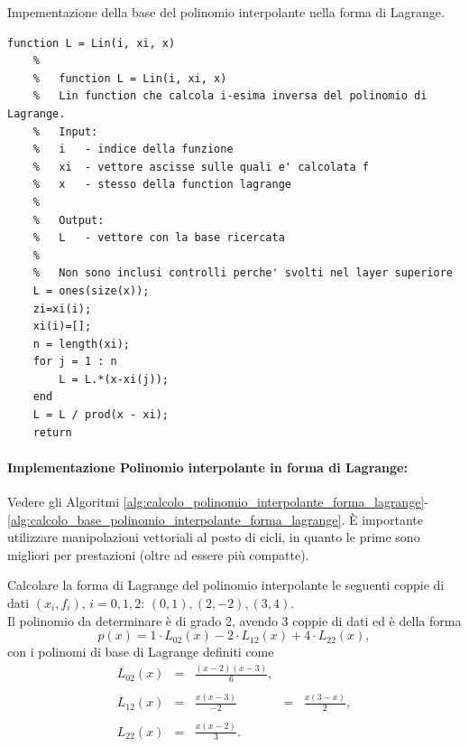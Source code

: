 \begin{algorithm}
\caption{Impementazione della base del polinomio interpolante nella forma di Lagrange.}\label{alg:calcolo_base_polinomio_interpolante_forma_lagrange}
    \begin{lstlisting}[style=Matlab-editor]
    function L = Lin(i, xi, x)
    %
    %   function L = Lin(i, xi, x)
    %   Lin function che calcola i-esima inversa del polinomio di Lagrange.
    %   Input:
    %   i   - indice della funzione
    %   xi  - vettore ascisse sulle quali e' calcolata f
    %   x   - stesso della function lagrange
    %
    %   Output:
    %   L   - vettore con la base ricercata
    %
    %   Non sono inclusi controlli perche' svolti nel layer superiore
    L = ones(size(x));
    zi=xi(i);
    xi(i)=[];
    n = length(xi);
    for j = 1 : n
        L = L.*(x-xi(j));
    end
    L = L / prod(x - xi);
    return
    \end{lstlisting}
\end{algorithm}

\paragraph{Implementazione Polinomio interpolante in forma di Lagrange:} Vedere gli Algoritmi \ref{alg:calcolo_polinomio_interpolante_forma_lagrange}-\ref{alg:calcolo_base_polinomio_interpolante_forma_lagrange}. È importante utilizzare manipolazioni vettoriali al posto di cicli, in quanto le prime sono migliori per prestazioni (oltre ad essere più compatte).

\begin{example}
	Calcolare la forma di Lagrange del polinomio interpolante le seguenti coppie di dati $(x_i, f_i),\, i=0,1,2$: $(0,1),(2,-2), (3,4)$.\\
	Il polinomio da determinare è di grado 2, avendo 3 coppie di dati ed è della forma
	\begin{equation*}
		p(x) = 1 \cdot L_{02}(x) - 2 \cdot L_{12}(x) + 4 \cdot L_{22}(x),
	\end{equation*}
	con i polinomi di base di Lagrange definiti come
	\begin{equation*}
		\begin{matrix}
			L_{02}(x) &=& \frac{(x-2)(x-3)}{6},\\\\
			L_{12}(x) &=& \frac{x(x-3)}{-2} &=& \frac{x(3-x)}{2},\\\\
			L_{22}(x) &=& \frac{x(x-2)}{3}.
		\end{matrix}
	\end{equation*}
\end{example}

